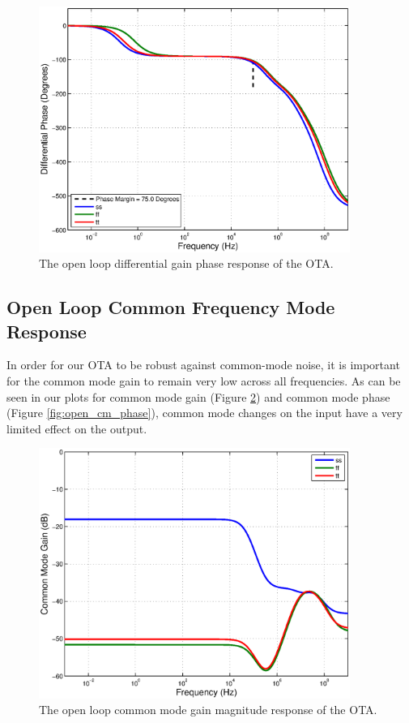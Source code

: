 \documentclass[journal]{IEEEtran}
\begin{document}
\begin{figure}
\centering
\includegraphics[width=4in]{Plots/open_dm_phase.eps}
\caption{The open loop differential gain phase response of the OTA.}
\label{fig:open_dm_phase}
\end{figure}

\subsection{Open Loop Common Frequency Mode Response}
In order for our OTA to be robust against common-mode noise, it is important for the common mode gain to remain very low across all frequencies. As can be seen in our plots for common mode gain (Figure \ref{fig:open_cm_gain}) and common mode phase (Figure \ref{fig:open_cm_phase}), common mode changes on the input have a very limited effect on the output.

\begin{figure}
\centering
\includegraphics[width=4in]{Plots/open_cm_gain.eps}
\caption{The open loop common mode gain magnitude response of the OTA.}
\label{fig:open_cm_gain}
\end{figure}
\end{document}
